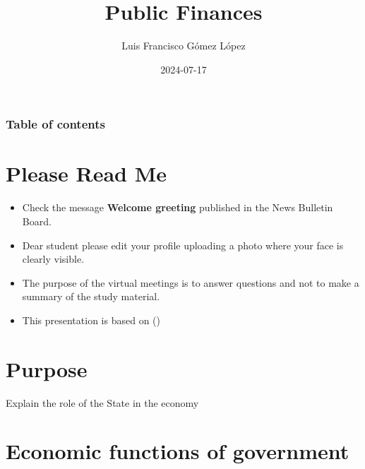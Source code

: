 \documentclass[
  ignorenonframetext,
]{beamer}
\title{Public Finances}
\author{Luis Francisco Gómez López}
\date{2024-07-17}
\institute{FAEDIS}
\renewcommand*\contentsname{Table of contents}
\newcommand\contentsname{Table of contents}
\begin{document}
\frame{\titlepage}

\renewcommand*\contentsname{Table of contents}
\begin{frame}[allowframebreaks]
  \frametitle{Table of contents}
  \tableofcontents[hideallsubsections]
\end{frame}

\section{Please Read Me}\label{please-read-me}

\begin{frame}{}
\label{section}
\begin{itemize}
\item
  Check the message \textbf{Welcome greeting} published in the News
  Bulletin Board.
\item
  Dear student please edit your profile uploading a photo where your
  face is clearly visible.
\item
  The purpose of the virtual meetings is to answer questions and not to
  make a summary of the study material.
\item
  This presentation is based on
  ()
\end{itemize}
\end{frame}

\section{Purpose}\label{purpose}

\begin{frame}{}
\label{section-1}
Explain the role of the State in the economy
\end{frame}

\section{Economic functions of
government}\label{economic-functions-of-government}
\end{document}
